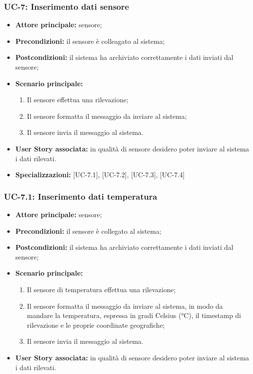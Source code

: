 \documentclass[8pt]{article}
\begin{document}
\subsubsection*{UC-7: Inserimento dati sensore}
\begin{itemize}
    \item \textbf{Attore principale:} sensore;
    \item \textbf{Precondizioni:} il sensore è colleagato al sistema;
    \item \textbf{Postcondizioni:} il sistema ha archiviato correttamente i dati inviati dal sensore;
    \item \textbf{Scenario principale:}
        \begin{enumerate}
        \item Il sensore effettua una rilevazione;
        \item Il sensore formatta il messaggio da inviare al sistema;
        \item Il sensore invia il messaggio al sistema.
        \end{enumerate}
    \item \textbf{User Story associata:} in qualità di sensore desidero poter inviare al sistema i
        dati rilevati.
    \item \textbf{Specializzazioni:} [UC-7.1], [UC-7.2], [UC-7.3], [UC-7.4]
\end{itemize}
\subsubsection*{UC-7.1: Inserimento dati temperatura}
\begin{itemize}
    \item \textbf{Attore principale:} sensore;
    \item \textbf{Precondizioni:} il sensore è collegato al sistema;
    \item \textbf{Postcondizioni:} il sistema ha archiviato correttamente i dati inviati dal sensore;
    \item \textbf{Scenario principale:}
        \begin{enumerate}
        \item Il sensore di temperatura effettua una rilevazione;
        \item Il sensore formatta il messaggio da inviare al sistema, in modo da mandare la
temperatura, espressa in gradi Celsius (°C), il timestamp di rilevazione e le proprie
coordinate geografiche;
        \item Il sensore invia il messaggio al sistema.
        \end{enumerate}
    \item \textbf{User Story associata:} in qualità di sensore desidero poter inviare al sistema i
        dati rilevati.
\end{itemize}
\end{document}
